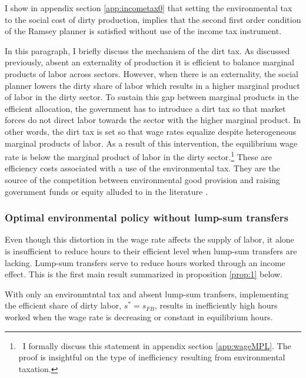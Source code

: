 I show in appendix section \ref{app:incometax0} that setting the environmental tax to the social cost of dirty production, implies that the second first order condition of the Ramsey planner is satisfied without use of the income tax instrument. %

In this paragraph, I briefly discuss the mechanism of the dirt tax.
As discussed previously, absent an externality of production it is efficient to balance marginal products of labor across sectors. However, when there is an externality, the social planner lowers the dirty share of labor which results in a higher marginal product of labor in the dirty sector. To sustain this gap between marginal products in the efficient allocation, the government has to introduce a dirt tax so that market forces do not direct labor towards the sector with the higher marginal product. In other words, the dirt tax is set so that wage rates equalize despite heterogeneous marginal products of labor. As a result of this intervention, the equilibrium wage rate is below the marginal product of labor in the dirty sector.\footnote{\ I formally discuss this statement in appendix section \ref{app:wageMPL}. The proof is insightful on the type of inefficiency resulting from environmental taxation. } These are efficiency costs associated with a use of the environmental tax. They are the source of the competition between environmental good provision and raising government funds or equity alluded to in the literature \citep{LansBovenberg1994EnvironmentalTaxation}.  

\subsubsection{Optimal environmental policy without lump-sum transfers}

Even though this distortion in the wage rate affects the supply of labor, it alone is insufficient to reduce hours to their efficient level when lump-sum transfers are lacking. %
Lump-sum transfers serve to reduce hours worked through an income effect.
This is the first main result summarized in proposition \ref{prop:1} below. 

\begin{prop}\label{prop:1}
	With only an environmtntal tax and absent lump-sum tranfsers, 
implementing the efficient share of dirty labor, $s^*=s_{FB}$, results in inefficiently high hours worked when the wage rate is decreasing or constant in equilibrium hours. %
\end{prop}

